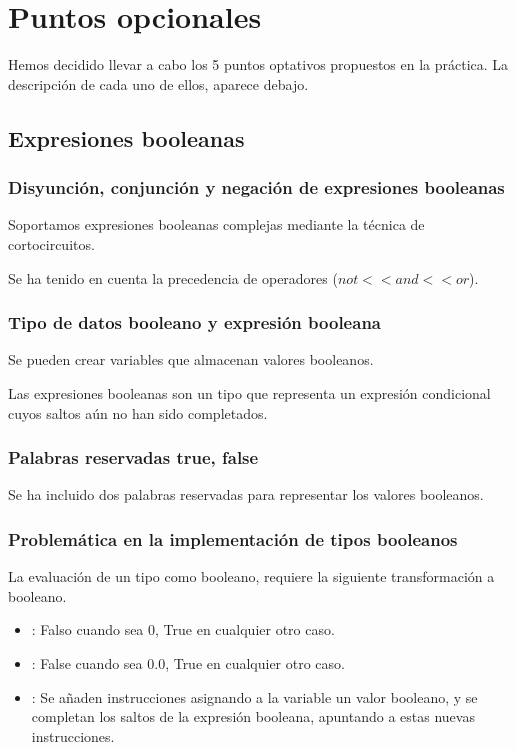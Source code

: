 \chapter{Puntos opcionales}

Hemos decidido llevar a cabo los 5 puntos optativos propuestos en la práctica. La descripción de cada uno de ellos, aparece debajo.

\section{Expresiones booleanas}
	
	\subsection{Disyunción, conjunción y negación de expresiones booleanas}
	
		Soportamos expresiones booleanas complejas mediante la técnica de cortocircuitos.
		
		Se ha tenido en cuenta la precedencia de operadores ($not << and << or$).

	\subsection{Tipo de datos booleano y expresión booleana}
	
		Se pueden crear variables que almacenan valores booleanos.
		
		Las expresiones booleanas son un tipo que representa un expresión condicional cuyos saltos aún no han sido completados.
		
	\subsection{Palabras reservadas true, false}
	
		Se ha incluido dos palabras reservadas para representar los valores booleanos.
		
	\subsection{Problemática en la implementación de tipos booleanos}
	
		La evaluación de un tipo como booleano, requiere la siguiente transformación a booleano. 
		
		\begin{itemize}
			\item {}: Falso cuando sea 0, True en cualquier otro caso.
			\item {}: False cuando sea 0.0, True en cualquier otro caso.
			\item {}: Se añaden instrucciones asignando a la variable un valor booleano, y se completan los saltos de la expresión booleana, apuntando a estas nuevas instrucciones.
		\end{itemize}
	
